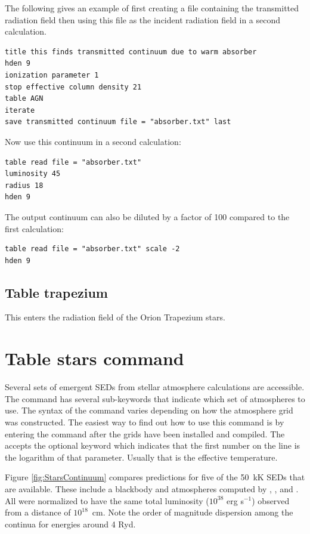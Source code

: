 The following gives an example of first creating a file containing the
transmitted radiation field then using this file as the
incident radiation field in a second calculation.
\begin{verbatim}
title this finds transmitted continuum due to warm absorber
hden 9
ionization parameter 1
stop effective column density 21
table AGN
iterate
save transmitted continuum file = "absorber.txt" last
\end{verbatim}
Now use this continuum in a second calculation:
\begin{verbatim}
table read file = "absorber.txt"
luminosity 45
radius 18
hden 9
\end{verbatim}
The output continuum can also be diluted by a factor of 100 compared
to the first calculation:
\begin{verbatim}
table read file = "absorber.txt" scale -2
hden 9
\end{verbatim}

\subsection{Table trapezium}
\label{sec:CommandTableTrapezium}

This enters the radiation field of the Orion Trapezium stars.


\section{Table stars command}
\label{sect:TableStars}

Several sets of emergent SEDs from stellar atmosphere calculations are
accessible.
The command has several sub-keywords that indicate which set
of atmospheres to use. The syntax of the command varies depending on
how the atmosphere grid was constructed. The easiest way to find out
how to use this command is by entering the command  after the grids have been installed and compiled. The 
 accepts the optional keyword 
which indicates that the first number on the line is the logarithm of
that parameter. Usually that is the effective temperature.

Figure \ref{fig:StarsContinuum} compares predictions for
five of the 50~kK SEDs that are
available.  These include a blackbody and atmospheres computed by \citet{Mihalas1972}, \citet{Kurucz1979}, \citet{Kurucz1991} and \citet{Rauch2002}.
All were normalized
to have the same total luminosity ($10^{38}$ erg s$^{-1}$)
observed from a distance of $10^{18}$~cm.
Note the order of magnitude dispersion among the continua for
energies around 4 Ryd.

